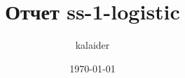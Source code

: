 \def\usetitle{}
\def\usegraphics{}



\title{Отчет ss-1-logistic}
\def\subtitle{....}
\def\edition{[reports]\ \#\ 1}
\author{kalaider}
\date{\today}


	
	\ifdefined\usetitle
	    
	\fi
	
	

